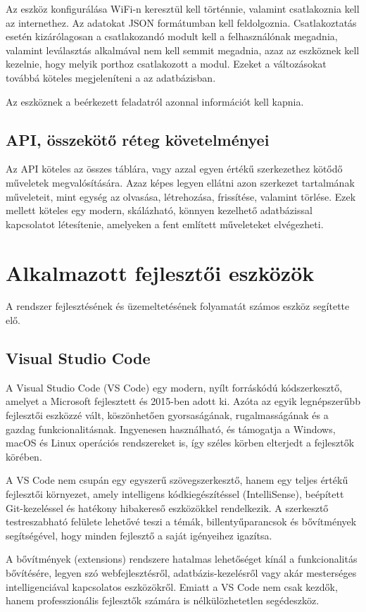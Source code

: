\documentclass{thesis-ekf}
\theoremstyle{definition}
\theoremstyle{remark}
\begin{document}
	Az eszköz konfigurálása WiFi-n keresztül kell történnie, valamint csatlakoznia kell az internethez. Az adatokat JSON formátumban kell feldolgoznia. Csatlakoztatás esetén kizárólagosan a csatlakozandó modult kell a felhasználónak megadnia, valamint leválasztás alkalmával nem kell semmit megadnia, azaz az eszköznek kell kezelnie, hogy melyik porthoz csatlakozott a modul. Ezeket a változásokat továbbá köteles megjeleníteni a az adatbázisban.
	
	Az eszköznek a beérkezett feladatról azonnal információt kell kapnia.
	\subsection{API, összekötő réteg követelményei}
	Az API köteles az összes táblára, vagy azzal egyen értékű szerkezethez kötődő műveletek megvalósítására. Azaz képes legyen ellátni azon szerkezet tartalmának műveleteit, mint egység az olvasása, létrehozása, frissítése, valamint törlése. Ezek mellett köteles egy modern, skálázható, könnyen kezelhető adatbázissal kapcsolatot létesítenie, amelyeken a fent említett műveleteket elvégezheti.
	\section{Alkalmazott fejlesztői eszközök}
	A rendszer fejlesztésének és üzemeltetésének folyamatát számos eszköz segítette elő.
	\subsection{Visual Studio Code}
	A Visual Studio Code (VS Code) egy modern, nyílt forráskódú kódszerkesztő, amelyet a Microsoft fejlesztett és 2015-ben adott ki. Azóta az egyik legnépszerűbb fejlesztői eszközzé vált, köszönhetően gyorsaságának, rugalmasságának és a gazdag funkcionalitásnak. Ingyenesen használható, és támogatja a Windows, macOS és Linux operációs rendszereket is, így széles körben elterjedt a fejlesztők körében.
	
	A VS Code nem csupán egy egyszerű szövegszerkesztő, hanem egy teljes értékű fejlesztői környezet, amely intelligens kódkiegészítéssel (IntelliSense), beépített Git-kezeléssel és hatékony hibakereső eszközökkel rendelkezik. A szerkesztő testreszabható felülete lehetővé teszi a témák, billentyűparancsok és bővítmények segítségével, hogy minden fejlesztő a saját igényeihez igazítsa.
	
	A bővítmények (extensions) rendszere hatalmas lehetőséget kínál a funkcionalitás bővítésére, legyen szó webfejlesztésről, adatbázis-kezelésről vagy akár mesterséges intelligenciával kapcsolatos eszközökről. Emiatt a VS Code nem csak kezdők, hanem professzionális fejlesztők számára is nélkülözhetetlen segédeszköz.
	
\end{document}
